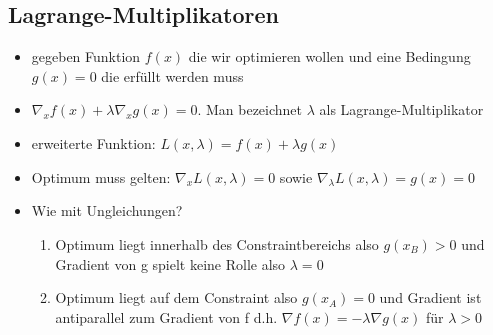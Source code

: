 \documentclass{article} %
\begin{document}
	\subsection{Lagrange-Multiplikatoren}
	\begin{itemize}
		\item gegeben Funktion $f(x)$ die wir optimieren wollen und eine Bedingung $g(x) = 0$ die erfüllt werden muss
		\item $\nabla_x f(x) + \lambda\nabla_x g(x) = 0$. Man bezeichnet $\lambda$ als Lagrange-Multiplikator
		\item erweiterte Funktion: $L(x,\lambda) = f(x) + \lambda g(x)$
		\item Optimum muss gelten: $\nabla_x L(x,\lambda) = 0$ sowie $\nabla_\lambda L(x,\lambda) = g(x) = 0$
		\item Wie mit Ungleichungen?
		\begin{enumerate}
			\item Optimum liegt innerhalb des Constraintbereichs also $g(x_B) > 0$ und Gradient von g spielt keine Rolle also $\lambda = 0$
			\item Optimum liegt auf dem Constraint also $g(x_A) = 0$ und Gradient ist antiparallel zum Gradient von f d.h. $\nabla f(x) = -\lambda\nabla g(x)$ für $\lambda > 0$
		\end{enumerate}
	\end{itemize}
\end{document}
